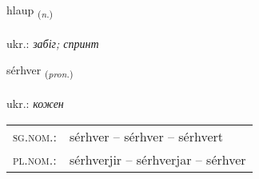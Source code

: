 \documentclass[frontgrid, backgrid]{flacards}\usepackage[]{graphicx}\usepackage[]{xcolor}
\begin{document}
\renewcommand{\flhead}{\vskip5pt \fboxsep=0pt {\small\bfseries\footnotesize Nafnorð | іменник}}
\renewcommand{\fcfoot}{\vskip5pt \fboxsep=0pt \hspace{2pt}{\small\bfseries\footnotesize 3K}}

\renewcommand{\blhead}{\vskip5pt {\small\bfseries\footnotesize Nafnorð | іменник }}
\renewcommand{\bcfoot}{\vskip5pt \hspace{2pt}{\small\bfseries\footnotesize 3K}}


{hlaup \small{\textsubscript{(\textit{n.})}} \\[1ex] %
\textphonetic{[l̥œiːp]} \\
ukr.: \emph{забіг; спринт} \\  [2ex]
\renewcommand*{\arraystretch}{0.8}
}

\renewcommand{\flhead}{\vskip5pt \fboxsep=0pt {\small\bfseries\footnotesize Fornafn | займенник}}
\renewcommand{\fcfoot}{\vskip5pt \fboxsep=0pt \hspace{2pt}{\small\bfseries\footnotesize 3K}}

\renewcommand{\blhead}{\vskip5pt {\small\bfseries\footnotesize Fornafn | займенник }}
\renewcommand{\bcfoot}{\vskip5pt \hspace{2pt}{\small\bfseries\footnotesize 3K}}


{sérhver \small{\textsubscript{(\textit{pron.})}} \\[1ex] %
 \\
ukr.: \emph{кожен} \\  [2ex]
\renewcommand*{\arraystretch}{0.8}
\begin{tabular}{ll}
\textsc{sg.nom.}: & sérhver  --  sérhver -- sérhvert \\ 
\textsc{pl.nom.}: & sérhverjir -- sérhverjar -- sérhver
\end{tabular}
}
\end{document}
